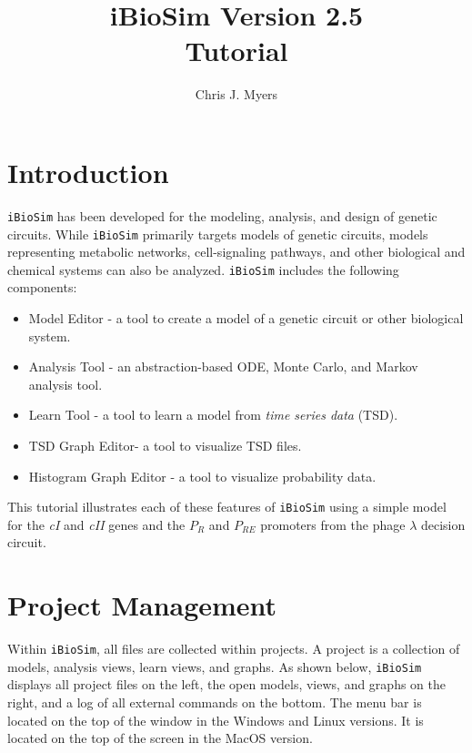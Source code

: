 \documentclass[titlepage,11pt]{article}
\title{iBioSim Version 2.5 \\ Tutorial}
\author{Chris J. Myers}
\begin{document}
\maketitle

  
\tableofcontents

\clearpage

\section{Introduction}

\noindent
{\tt iBioSim} has been developed for the modeling, analysis, and design of genetic circuits.  While {\tt iBioSim} primarily targets models of genetic circuits, models representing metabolic networks, cell-signaling pathways, and other biological and chemical systems can also be analyzed.  {\tt iBioSim} includes the following components: 

\begin{itemize}
\item Model Editor - a tool to create a model of a genetic circuit or other biological system.
\item Analysis Tool - an abstraction-based ODE, Monte Carlo, and Markov analysis tool.
\item Learn Tool - a tool to learn a model from \emph{time series data} (TSD).
\item TSD Graph Editor- a tool to visualize TSD files. 
\item Histogram Graph Editor - a tool to visualize probability data. 
\end{itemize}

This tutorial illustrates each of these features of {\tt iBioSim} using a simple model for the \emph{cI} and \emph{cII} genes and the $P_R$ and $P_{RE}$ promoters from the phage $\lambda$ decision circuit.  


\section{Project Management}

\noindent
Within {\tt iBioSim}, all files are collected within projects.   A project is a collection of models, analysis views, learn views, and graphs.  As shown below, {\tt iBioSim} displays all project files on the left, the open models, views, and graphs on the right, and a log of all external commands on the bottom.  The menu bar is located on the top of the window in the Windows and Linux versions.  It is located on the top of the screen in the MacOS version.
\end{document}
